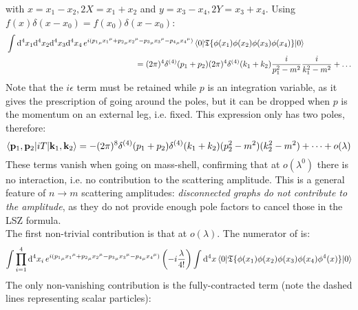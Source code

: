 with $ x = x_1 - x_2 , 2X = x_1 + x_2 $ and $ y = x_3 - x_4 , 2Y = x_3 + x_4 $. Using $ f(x) \delta(x - x_0) = f(x_0) \delta(x - x_0) $:
\begin{equation*}
  \begin{split}
    & \int \mathrm{d}^4x_1 \mathrm{d}^4x_2 \mathrm{d}^4x_3 \mathrm{d}^4x_4\, e^{i ({p_1}_\mu {x_1}^\mu + {p_2}_\mu {x_2}^\mu - {p_3}_\mu {x_3}^\mu - {p_4}_\mu {x_4}^\mu)} \braket{0 | \mathfrak{T}\{\phi(x_1) \phi(x_2) \phi(x_3) \phi(x_4)\} | 0} \\
    & \qquad \qquad \qquad \qquad \qquad \qquad \qquad \qquad = (2\pi)^4 \delta^{(4)}(p_1 + p_2) (2\pi)^4 \delta^{(4)}(k_1 + k_2) \frac{i}{p_1^2 - m^2} \frac{i}{k_1^2 - m^2} + \dots
  \end{split}
\end{equation*}
Note that the $ i\epsilon $ term must be retained while $ p $ is an integration variable, as it gives the prescription of going around the poles, but it can be dropped when $ p $ is the momentum on an external leg, i.e. fixed. This expression only has two poles, therefore:
\begin{equation*}
  \braket{\mathbf{p}_1 , \mathbf{p}_2 | i T | \mathbf{k}_1 , \mathbf{k}_2} = - (2\pi)^8 \delta^{(4)}(p_1 + p_2) \delta^{(4)}(k_1 + k_2) (p_2^2 - m^2) (k_2^2 - m^2) + \dots + o(\lambda)
\end{equation*}
These terms vanish when going on mass-shell, confirming that at $ o(\lambda^0) $ there is no interaction, i.e. no contribution to the scattering amplitude. This is a general feature of $ n \rightarrow m $ scattering amplitudes: \textit{disconnected graphs do not contribute to the amplitude}, as they do not provide enough pole factors to cancel those in the LSZ formula. \\
The first non-trivial contribution is that at $ o(\lambda) $. The numerator of  is:
\begin{equation*}
  \int \prod_{i = 1}^4 \mathrm{d}^4x_i\, e^{i ({p_1}_\mu {x_1}^\mu + {p_2}_\mu {x_2}^\mu - {p_3}_\mu {x_3}^\mu - {p_4}_\mu {x_4}^\mu)} \left( - i \frac{\lambda}{4!} \right) \int \mathrm{d}^4x \braket{0 | \mathfrak{T}\{\phi(x_1) \phi(x_2) \phi(x_3) \phi(x_4) \phi^4(x)\} | 0}
\end{equation*}
The only non-vanishing contribution is the fully-contracted term (note the dashed lines representing scalar particles):

